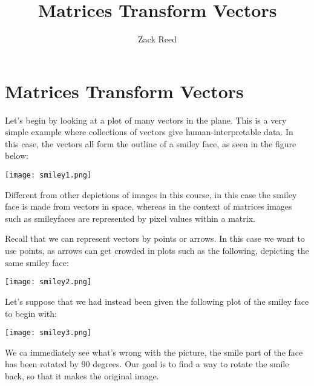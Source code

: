 \documentclass{ximera}
\author{Zack Reed}
\title{Matrices Transform Vectors}
\begin{document}
\begin{abstract}

\end{abstract}
\maketitle

\section*{Matrices Transform Vectors}

    Let's begin by looking at a plot of many vectors in the plane. This is a very simple example where collections of vectors give human-interpretable data. In this case, the vectors all form the outline of a smiley face, as seen in the figure below:

    \begin{center}
        \texttt{[image: smiley1.png]}
    \end{center}

    \begin{remark}

        Different from other depictions of images in this course, in this case the smiley face is made from vectors in space, whereas in the context of matrices images such as smileyfaces are represented by pixel values within a matrix.

        Recall that we can represent vectors by points or arrows. In this case we want to use points, as arrows can get crowded in plots such as the following, depicting the same smiley face:

        \begin{center}
            \texttt{[image: smiley2.png]}
        \end{center}

    \end{remark}


        Let's suppose that we had instead been given the following plot of the smiley face to begin with:

        \begin{center}
            \texttt{[image: smiley3.png]}
        \end{center}

        We ca immediately see what's wrong with the picture, the smile part of the face has been rotated by 90 degrees. Our goal is to find a way to rotate the smile back, so that it makes the original image.
\end{document}
